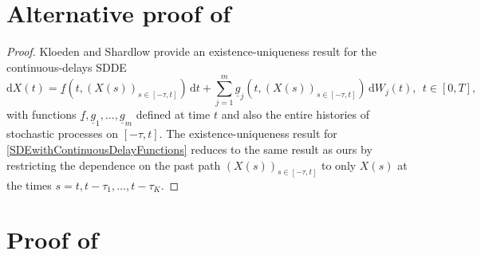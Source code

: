 \documentclass[onefignum]{siamart250211}
\begin{document}
\section[Alternative proof of existence-uniqueness]{Alternative proof of }\label{AlternativeProofofPLS}

\begin{proof}
Kloeden and Shardlow \cite{KloedenShardlow2012} provide an existence-uniqueness result for the continuous-delays SDDE
\begin{equation}\mathrm{d}X(t)=\underline{f}(t,(X(s))_{s\in[-\tau,t]})\,\mathrm{d}t+\sum_{j=1}^m\underline{g}_j(t,(X(s))_{s\in[-\tau,t]})\,\mathrm{d}W_j(t),\;\,t\in[0,T],\label{SDEwithContinuousDelayFunctions}\end{equation}
with functions $\underline{f},\underline{g}_1,\ldots,\underline{g}_m$ defined at time $t$ and also the entire histories of stochastic processes on $[-\tau,t]$. The existence-uniqueness result for \cref{SDEwithContinuousDelayFunctions} reduces to the same result as ours by restricting the dependence on the past path $(X(s))_{s\in[-\tau,t]}$ to only $X(s)$ at the times $s=t,t-\tau_1,\ldots,t-\tau_K$.
\end{proof}


\section[Proof of Milstein SDDE expansion]{Proof of }\label{ProofofItoTaylorKuchlerPlaten}
\end{document}
